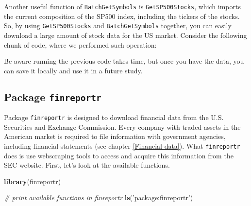 \documentclass[11pt,]{book}
\newenvironment{Shaded}{\begin{snugshade}}{\end{snugshade}}
\newcommand{\KeywordTok}[1]{\textcolor[rgb]{0.27,0.27,0.27}{\textbf{#1}}}
\newcommand{\DataTypeTok}[1]{\textcolor[rgb]{0.27,0.27,0.27}{#1}}
\newcommand{\DecValTok}[1]{\textcolor[rgb]{0.06,0.06,0.06}{#1}}
\newcommand{\StringTok}[1]{\textcolor[rgb]{0.5,0.5,0.5}{#1}}
\newcommand{\CommentTok}[1]{\textcolor[rgb]{0.56,0.35,0.01}{\textit{#1}}}
\newcommand{\OperatorTok}[1]{\textcolor[rgb]{0.81,0.36,0.00}{\textbf{#1}}}
\newcommand{\NormalTok}[1]{#1}
\begin{document}
Another useful function of \texttt{BatchGetSymbols} is
\texttt{GetSP500Stocks}, which imports the current composition of the
SP500 index, including the tickers of the stocks. So, by using
\texttt{GetSP500Stocks} and \texttt{BatchGetSymbols} together, you can
easily download a large amount of stock data for the US market. Consider
the following chunk of code, where we performed such operation:

\begin{Shaded}
\end{Shaded}

Be aware running the previous code takes time, but once you have the
data, you can save it locally and use it in a future study.

\subsection{\texorpdfstring{Package
\texttt{finreportr}}{Package finreportr}}\label{package-finreportr}

Package \texttt{finreportr} \citep{finreportr} is designed to download
financial data from the U.S. Securities and Exchange Commission. Every
company with traded assets in the American market is required to file
information with government agencies, including financial statements
(see chapter \ref{Financial-data}). What \texttt{finreportr} does is use
webscraping tools to access and acquire this information from the SEC
website. First, let's look at the available functions.

\begin{Shaded}
\begin{Highlighting}[]
\KeywordTok{library}\NormalTok{(finreportr)}

\CommentTok{# print available functions in finreportr}
\KeywordTok{ls}\NormalTok{(}\StringTok{'package:finreportr'}\NormalTok{)}
\end{Highlighting}
\end{Shaded}
\end{document}
